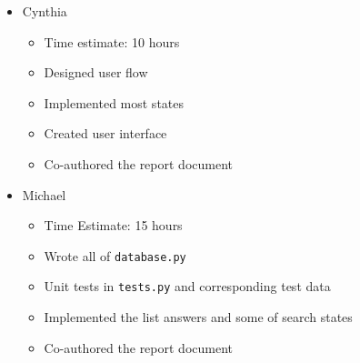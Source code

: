 \documentclass{article}
\begin{document}
\begin{itemize}
    \item Cynthia
          \begin{itemize}
              \item Time estimate: 10 hours
              \item Designed user flow
              \item Implemented most states
              \item Created user interface
              \item Co-authored the report document
          \end{itemize}
    \item Michael
          \begin{itemize}
              \item Time Estimate: 15 hours
              \item Wrote all of \verb|database.py|
              \item Unit tests in \verb|tests.py| and corresponding test data
              \item Implemented the list answers and some of search states
              \item Co-authored the report document
          \end{itemize}
\end{itemize}
\end{document}
